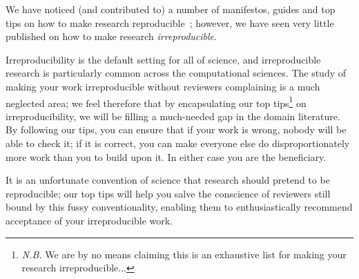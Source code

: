 \documentclass[a4paper,11pt]{article}
\begin{document}
We have noticed (and contributed to) a number of manifestos, guides
and top tips on how to make research
reproducible~\cite{prlic+procter:2012,sandve-et-al:2013,gent_recomputation.org_2014,gent:2013,wilson-et-al:2014,goble:2014,crick-et-al_wssspe2,crick-et-al_recomp2014,stodden+miguez:2014};
however, we have seen very little published on how to make research
\emph{irreproducible}.

Irreproducibility is the default setting for all of science, and
irreproducible research is particularly common across the
computational sciences. The study of making your work irreproducible
without reviewers complaining is a much neglected area; we feel
therefore that by encapsulating our top tips\footnote{{\emph{N.B.}} We
are by no means claiming this is an exhaustive list for making your
research irreproducible...} on irreproducibility, we will be filling a
much-needed gap in the domain literature. By following our tips, you
can ensure that if your work is wrong, nobody will be able to check it;
if it is correct, you can make everyone else do disproportionately
more work than you to build upon it. In either case you are the
beneficiary.

It is an unfortunate convention of science that research should
pretend to be reproducible; our top tips will help you salve the
conscience of reviewers still bound by this fussy conventionality,
enabling them to enthusiastically recommend acceptance of your
irreproducible work.
\end{document}
